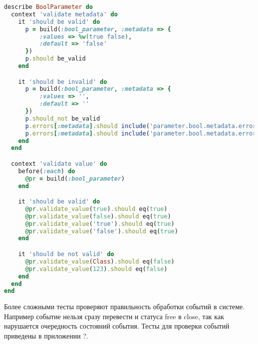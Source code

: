 \begin{lstlisting}[language=Ruby,caption=Тестирование возможных значений для
булевого параметра ,label={lst:test_bool_parameter}] 
describe BoolParameter do
  context 'validate metadata' do
    it 'should be valid' do
      p = build(:bool_parameter, :metadata => {
          :values => %w(true false),
          :default => 'false'
      })
      p.should be_valid
    end

    it 'should be invalid' do
      p = build(:bool_parameter, :metadata => {
          :values => '',
          :default => ''
      })
      p.should_not be_valid
      p.errors[:metadata].should include('parameter.bool.metadata.errors.default')
      p.errors[:metadata].should include('parameter.bool.metadata.errors.values')
    end
  end

  context 'validate value' do
    before(:each) do
      @pr = build(:bool_parameter)
    end

    it 'should be valid' do
      @pr.validate_value(true).should eq(true)
      @pr.validate_value(false).should eq(true)
      @pr.validate_value('true').should eq(true)
      @pr.validate_value('false').should eq(true)
    end

    it 'should be not valid' do
      @pr.validate_value(Class).should eq(false)
      @pr.validate_value(123).should eq(false)
    end
  end
end
\end{lstlisting}

Более сложными тесты проверяют правильность обработки событий в системе.
Например событие нельзя сразу перевести и статуса free в close, так как
нарушается очередность состояний события. Тесты для проверки событий приведены в
приложении ?.
